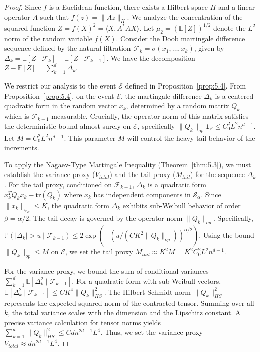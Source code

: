 \documentclass[11pt]{amsart}
\theoremstyle{definition}
\theoremstyle{remark}
\begin{document}
\begin{proof}
Since $f$ is a Euclidean function, there exists a Hilbert space $H$ and a linear operator $A$ such that $f(z) = \|Az\|_H$. We analyze the concentration of the squared function $Z = f(X)^2 = \langle X, A^*A X \rangle$. Let $\mu_2 = (\mathbb{E}[Z])^{1/2}$ denote the $L^2$ norm of the random variable $f(X)$. Consider the Doob martingale difference sequence defined by the natural filtration $\mathcal{F}_k = \sigma(x_1, \dots, x_k)$, given by $\Delta_k = \mathbb{E}[Z \mid \mathcal{F}_k] - \mathbb{E}[Z \mid \mathcal{F}_{k-1}]$. We have the decomposition $Z - \mathbb{E}[Z] = \sum_{k=1}^d \Delta_k$.

We restrict our analysis to the event $\mathcal{E}$ defined in Proposition~\ref{prop:5.4}. From Proposition~\ref{prop:5.4}, on the event $\mathcal{E}$, the martingale difference $\Delta_k$ is a centered quadratic form in the random vector $x_k$, determined by a random matrix $Q_k$ which is $\mathcal{F}_{k-1}$-measurable. Crucially, the operator norm of this matrix satisfies the deterministic bound almost surely on $\mathcal{E}$, specifically $\|Q_k\|_{op} \mathbf{1}_{\mathcal{E}} \le C_0^2 L^2 n^{d-1}$. Let $M = C_0^2 L^2 n^{d-1}$. This parameter $M$ will control the heavy-tail behavior of the increments.

To apply the Nagaev-Type Martingale Inequality (Theorem~\ref{thm:5.3}), we must establish the variance proxy ($V_{total}$) and the tail proxy ($M_{tail}$) for the sequence $\Delta_k$. For the tail proxy, conditioned on $\mathcal{F}_{k-1}$, $\Delta_k$ is a quadratic form $x_k^T Q_k x_k - \text{tr}(Q_k)$ where $x_k$ has independent components in $\mathcal{S}_\alpha$. Since $\|x_k\|_{\psi_\alpha} \le K$, the quadratic form $\Delta_k$ exhibits sub-Weibull behavior of order $\beta = \alpha/2$. The tail decay is governed by the operator norm $\|Q_k\|_{op}$. Specifically, $\mathbb{P}(|\Delta_k| > u \mid \mathcal{F}_{k-1}) \le 2 \exp(-(u / (C K^2 \|Q_k\|_{op}))^{\alpha/2})$. Using the bound $\|Q_k\|_{op} \le M$ on $\mathcal{E}$, we set the tail proxy $M_{tail} \approx K^2 M = K^2 C_0^2 L^2 n^{d-1}$.

For the variance proxy, we bound the sum of conditional variances $\sum_{k=1}^d \mathbb{E}[\Delta_k^2 \mid \mathcal{F}_{k-1}]$. For a quadratic form with sub-Weibull vectors, $\mathbb{E}[\Delta_k^2 \mid \mathcal{F}_{k-1}] \le C K^4 \|Q_k\|_{HS}^2$. The Hilbert-Schmidt norm $\|Q_k\|_{HS}^2$ represents the expected squared norm of the contracted tensor. Summing over all $k$, the total variance scales with the dimension and the Lipschitz constant. A precise variance calculation for tensor norms yields $\sum_{k=1}^d \|Q_k\|_{HS}^2 \le C d n^{2d-1} L^4$. Thus, we set the variance proxy $V_{total} \approx d n^{2d-1} L^4$.


\end{proof}
\end{document}
